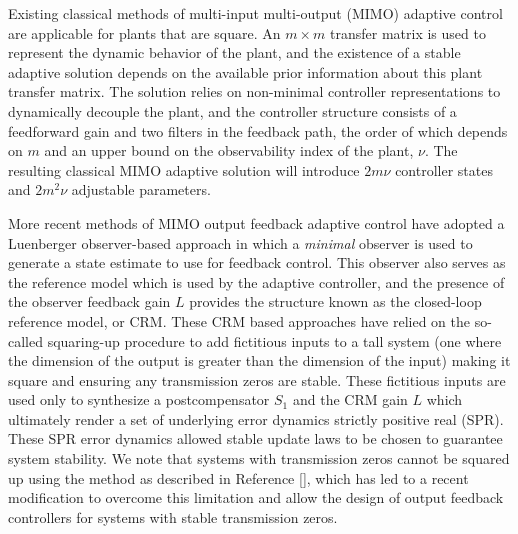 \documentclass[]{../sty/aiaa-tc}
\begin{document}
  Existing classical methods of multi-input multi-output (MIMO) adaptive control are applicable for plants that are square.
  An $m\times m$ transfer matrix is used to represent the dynamic behavior of the plant, and the existence of a stable adaptive solution depends on the available prior information about this plant transfer matrix\cite{singh.prior.1984,narendra.stable.2005}.
  The solution relies on non-minimal controller representations to dynamically decouple the plant, and the controller structure consists of a feedforward gain and two filters in the feedback path, the order of which depends on $m$ and an upper bound on the observability index of the plant, $\nu$.
  The resulting classical MIMO adaptive solution will introduce $2m\nu$ controller states and $2m^{2}\nu$ adjustable parameters.

  More recent methods of MIMO output feedback adaptive control have adopted a Luenberger observer-based approach in which a \textit{minimal} observer is used to generate a state estimate to use for feedback control\cite{lavretsky.output.2010,wise.obltrdesign.2013,qu.gnc.2013,lavretskywise.book.2013}.
  This observer also serves as the reference model which is used by the adaptive controller, and the presence of the observer feedback gain $L$ provides the structure known as the closed-loop reference model, or CRM\cite{gibson.aiaacrm.2012,gibson.ecc.2013,gibson.ieeeaccess.2013,gibson.acc.2013}.
  These CRM based approaches have relied on the so-called squaring-up procedure\cite{misra.squareup.1992} to add fictitious inputs to a tall system (one where the dimension of the output is greater than the dimension of the input) making it square and ensuring any transmission zeros are stable.
  These fictitious inputs are used only to synthesize a postcompensator $S_{1}$ and the CRM gain $L$ which ultimately render a set of underlying error dynamics strictly positive real (SPR).
  These SPR error dynamics allowed stable update laws to be chosen to guarantee system stability.
  We note that systems with transmission zeros cannot be squared up using the method as described in Reference [], which has led to a recent modification to overcome this limitation and allow the design of output feedback controllers for systems with stable transmission zeros\cite{quwiese.ifac.2014}.
\end{document}
